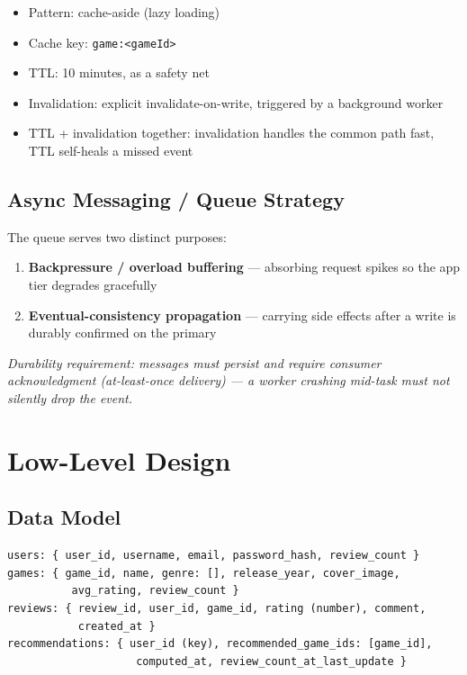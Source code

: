 \documentclass[11pt]{article}
\begin{document}
\begin{itemize}[nosep]
    \item Pattern: cache-aside (lazy loading)
    \item Cache key: \texttt{game:<gameId>}
    \item TTL: 10 minutes, as a safety net
    \item Invalidation: explicit invalidate-on-write, triggered by a background worker
    \item TTL + invalidation together: invalidation handles the common path fast, TTL self-heals a missed event
\end{itemize}

\subsection{Async Messaging / Queue Strategy}

The queue serves two distinct purposes:
\begin{enumerate}[nosep]
    \item \textbf{Backpressure / overload buffering} --- absorbing request spikes so the app tier degrades gracefully
    \item \textbf{Eventual-consistency propagation} --- carrying side effects after a write is durably confirmed on the primary
\end{enumerate}

\textit{Durability requirement: messages must persist and require consumer acknowledgment (at-least-once delivery) --- a worker crashing mid-task must not silently drop the event.}

\section{Low-Level Design}

\subsection{Data Model}

\begin{lstlisting}
users: { user_id, username, email, password_hash, review_count }
games: { game_id, name, genre: [], release_year, cover_image,
          avg_rating, review_count }
reviews: { review_id, user_id, game_id, rating (number), comment,
           created_at }
recommendations: { user_id (key), recommended_game_ids: [game_id],
                    computed_at, review_count_at_last_update }
\end{lstlisting}
\end{document}

